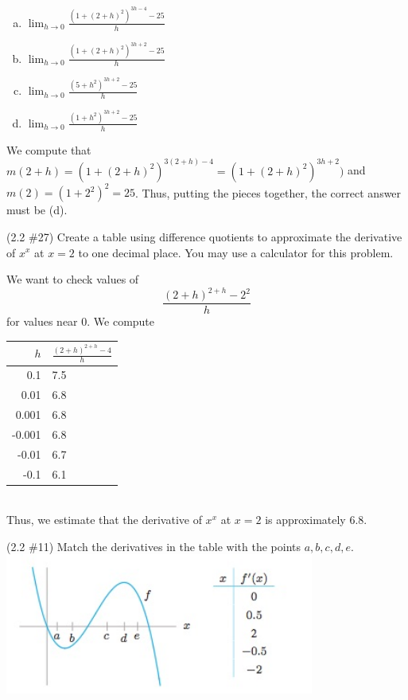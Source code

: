 \documentclass[11pt]{exam}
\begin{document}
\begin{questions}
\begin{multicols}{2}
\begin{enumerate}[(a)]
\item $\displaystyle\lim_{h \rightarrow 0} \frac{(1+(2+h)^2)^{3h-4}- 25}{h}$
\item $\displaystyle\lim_{h \rightarrow 0} \frac{(1+(2+h)^2)^{3h+2}- 25}{h}$
\item $\displaystyle\lim_{h \rightarrow 0} \frac{(5+h^2)^{3h+2}- 25}{h}$
\item $\displaystyle\lim_{h \rightarrow 0} \frac{(1+h^2)^{3h+2}- 25}{h}$
\end{enumerate}
\end{multicols}
\begin{solution}
  We compute that \(m(2+h) = (1+(2+h)^2)^{3(2+h)-4} =
  (1+(2+h)^2)^{3h+2})\) and \(m(2)=(1+2^2)^{2} = 25\). Thus, putting
  the pieces together, the correct answer must be (d).
\end{solution}
\question (2.2 \#27) Create a table using difference quotients to
  approximate the derivative of $x^x$ at $x=2$ to one decimal
  place. You may use a calculator for this problem.
  \begin{solution}
    We want to check values of \[
      \frac{(2+h)^{2+h}-2^2}{h}
    \]
    for values near \(0\). We compute\\
    \begin{tabular}{|r|l|}
      \hline \(h\) & \(\frac{(2+h)^{2+h}-4}{h}\)\\
      \hline 0.1 & 7.5 \\
      \hline 0.01 & 6.8\\
      \hline 0.001 & 6.8\\
      \hline -0.001 & 6.8\\
      \hline -0.01 & 6.7\\
      \hline -0.1 & 6.1\\
      \hline
    \end{tabular}\\
    Thus, we estimate that the derivative of \(x^x\) at \(x=2\) is
    approximately \(6.8\).
  \end{solution}
\question  (2.2 \#11)  Match the derivatives in the table with the points $a,b,c,d,e$.\\
	\includegraphics[width=4in]{no11.jpg}

\end{questions}
\end{document}
